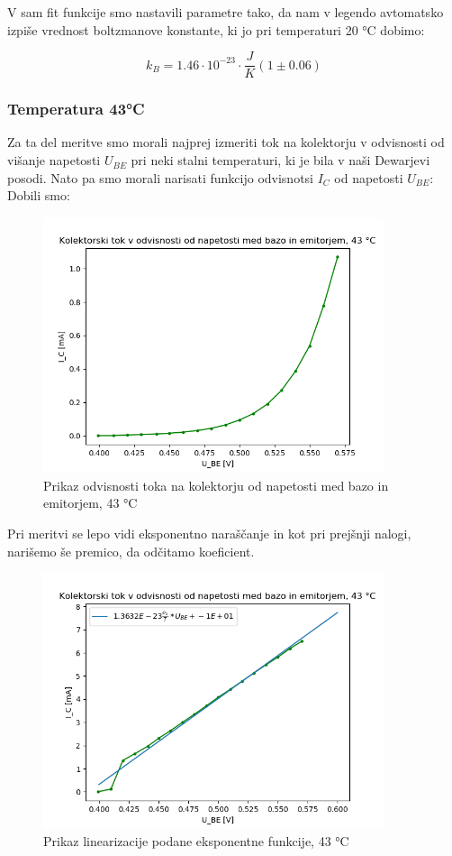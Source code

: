 \documentclass[11pt, a4paper]{article}
\theoremstyle{definition}
\theoremstyle{example}
\theoremstyle{izrek}
\begin{document}
V sam fit funkcije smo nastavili parametre tako, da nam v legendo avtomatsko izpiše vrednost boltzmanove konstante, ki jo pri temperaturi 20 °C dobimo:

$$k_B=1.46\cdot 10^{-23} \cdot \frac{J}{K} (1 \pm 0.06)$$
\subsubsection{Temperatura 43°C}
Za ta del meritve smo morali najprej izmeriti tok na kolektorju v odvisnosti od višanje napetosti $U_{BE}$ pri neki stalni temperaturi, ki je bila v naši Dewarjevi posodi. Nato pa smo morali narisati funkcijo odvisnotsi $I_C$ od napetosti $U_{BE}$:
Dobili smo:
\begin{figure}[H]
    \centering
    \includegraphics[width=10cm]{Napetost-tok,43.png}
    \caption{Prikaz odvisnosti toka na kolektorju od napetosti med bazo in emitorjem, 43 °C}
\end{figure}
Pri meritvi se lepo vidi eksponentno naraščanje in kot pri prejšnji nalogi, narišemo še premico, da odčitamo koeficient.
\begin{figure}[H]
    \centering
    \includegraphics[width=10cm]{Napetost-tok_fit,43.png}
    \caption{Prikaz linearizacije podane eksponentne funkcije, 43 °C}
\end{figure}
\end{document}
